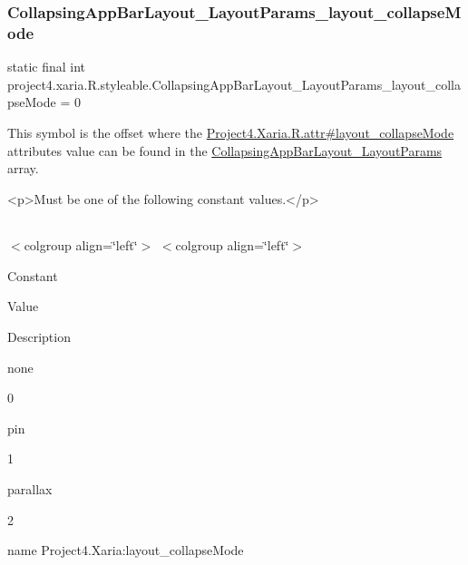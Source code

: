 \subsubsection{\texorpdfstring{Collapsing\+App\+Bar\+Layout\+\_\+\+Layout\+Params\+\_\+layout\+\_\+collapse\+Mode}{CollapsingAppBarLayout\_LayoutParams\_layout\_collapseMode}}
{\footnotesize\ttfamily static final int project4.\+xaria.\+R.\+styleable.\+Collapsing\+App\+Bar\+Layout\+\_\+\+Layout\+Params\+\_\+layout\+\_\+collapse\+Mode = 0\hspace{0.3cm}{\ttfamily [static]}}

This symbol is the offset where the \hyperlink{}{Project4.\+Xaria.\+R.\+attr\#layout\+\_\+collapse\+Mode} attribute\textquotesingle{}s value can be found in the \hyperlink{classproject4_1_1xaria_1_1R_1_1styleable_a22d4439a4550b11fcac1b86a5aaca608}{Collapsing\+App\+Bar\+Layout\+\_\+\+Layout\+Params} array.

\begin{DoxyVerb}      <p>Must be one of the following constant values.</p>
\end{DoxyVerb}
 \tabulinesep=1mm
\begin{longtabu} spread 0pt [c]{*{0}{|X[-1]}|}
\hline
\end{longtabu}
$<$colgroup align=\char`\"{}left\char`\"{}$>$ $<$colgroup align=\char`\"{}left\char`\"{}$>$ 

Constant

Value

Description 

{\ttfamily none}

0

{\ttfamily pin}

1

{\ttfamily parallax}

2

name Project4.\+Xaria\+:layout\+\_\+collapse\+Mode \mbox{\label{classproject4_1_1xaria_1_1R_1_1styleable_a04168d03b2bad3e184b322ab1bb66445}} 
